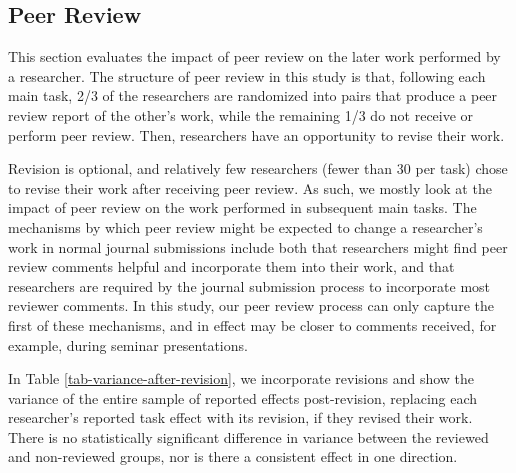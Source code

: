 \documentclass[
  letterpaper,
  DIV=11,
  numbers=noendperiod]{scrartcl}
\begin{document}
\hypertarget{peer-review}{%
\subsection{Peer Review}\label{peer-review}}

This section evaluates the impact of peer review on the later work
performed by a researcher. The structure of peer review in this study is
that, following each main task, 2/3 of the researchers are randomized
into pairs that produce a peer review report of the other's work, while
the remaining 1/3 do not receive or perform peer review. Then,
researchers have an opportunity to revise their work.

Revision is optional, and relatively few researchers (fewer than 30 per
task) chose to revise their work after receiving peer review. As such,
we mostly look at the impact of peer review on the work performed in
subsequent main tasks. The mechanisms by which peer review might be
expected to change a researcher's work in normal journal submissions
include both that researchers might find peer review comments helpful
and incorporate them into their work, and that researchers are required
by the journal submission process to incorporate most reviewer comments.
In this study, our peer review process can only capture the first of
these mechanisms, and in effect may be closer to comments received, for
example, during seminar presentations.

In Table \ref{tab-variance-after-revision}, we incorporate revisions and
show the variance of the entire sample of reported effects
post-revision, replacing each researcher's reported task effect with its
revision, if they revised their work. There is no statistically
significant difference in variance between the reviewed and non-reviewed
groups, nor is there a consistent effect in one direction.
\end{document}
